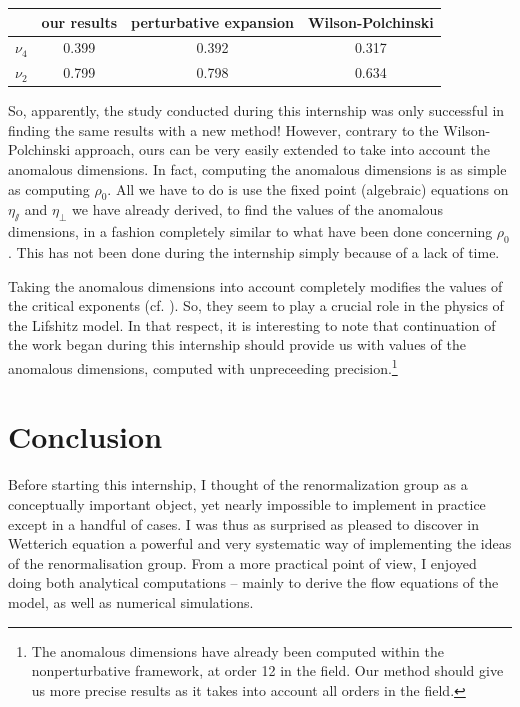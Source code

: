 \begin{center}
\label{tab:results}
\begin{tabular}{|c|c|c|c|}
\hline 
\rule[-1ex]{0pt}{2.5ex} ~ & our results & perturbative expansion & Wilson-Polchinski \\ 
\hline 
\rule[-1ex]{0pt}{2.5ex} $\nu_4$ & 0.399 & 0.392 & 0.317 \\ 
\hline 
\rule[-1ex]{0pt}{2.5ex} $\nu_2$ & 0.799 & 0.798 & 0.634 \\ 
\hline 
\end{tabular} 
\end{center}

So, apparently, the study conducted during this internship was only successful in finding the same results with a new method!
However, contrary to the Wilson-Polchinski approach, ours can be very easily extended to take into account the anomalous dimensions. In fact, computing the anomalous dimensions is as simple as computing $\rho_0$. All we have to do is use the fixed point (algebraic) equations on $\eta_\sslash$ and $\eta_\perp$ we have already derived, to find the values of the anomalous dimensions, in a fashion completely similar to what have been done concerning $\rho_0$. This has not been done during the internship simply because of a lack of time.

Taking the anomalous dimensions into account completely modifies the values of the critical exponents (cf. \cite{MouhannaLif}). So, they seem to play a crucial role in the physics of the Lifshitz model. 
In that respect, it is interesting to note that continuation of the work began during this internship should provide us with values of the anomalous dimensions, computed with unpreceeding precision.\footnote{The anomalous dimensions have already been computed within the nonperturbative framework, at order 12 in the field. Our method should give us more precise results as it takes into account all orders in the field.}


\section*{\huge{Conclusion}}

Before starting this internship, I thought of the renormalization group as a conceptually important object, yet nearly impossible to implement in practice except in a handful of cases. 
I was thus as surprised as pleased to discover in Wetterich equation a powerful and very systematic way of implementing the ideas of the renormalisation group. 
From a more practical point of view, I enjoyed doing both analytical computations -- mainly to derive the flow equations of the model, as well as numerical simulations.


